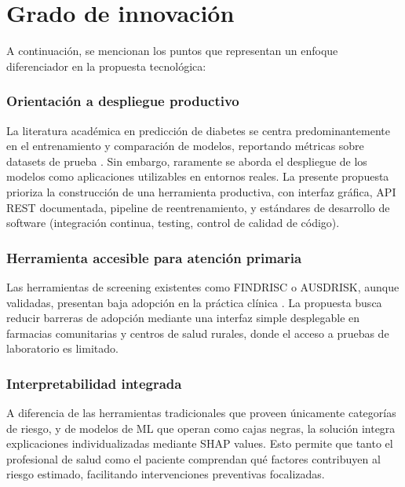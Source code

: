 \documentclass[12pt, a4paper]{report}
\begin{document}

\chapter{Grado de innovación}

A continuación, se mencionan los puntos que representan un enfoque diferenciador en la propuesta tecnológica:

\subsection*{Orientación a despliegue productivo}

La literatura académica en predicción de diabetes se centra predominantemente en el entrenamiento y comparación de modelos, reportando métricas sobre datasets de prueba \citep{qin2022machine, li2024diabetes}. Sin embargo, raramente se aborda el despliegue de los modelos como aplicaciones utilizables en entornos reales. La presente propuesta prioriza la construcción de una herramienta productiva, con interfaz gráfica, API REST documentada, pipeline de reentrenamiento, y estándares de desarrollo de software (integración continua, testing, control de calidad de código).

\subsection*{Herramienta accesible para atención primaria}

Las herramientas de screening existentes como FINDRISC o AUSDRISK, aunque validadas, presentan baja adopción en la práctica clínica \citep{wong2011ausdrisk}. La propuesta busca reducir barreras de adopción mediante una interfaz simple desplegable en farmacias comunitarias y centros de salud rurales, donde el acceso a pruebas de laboratorio es limitado.

\subsection*{Interpretabilidad integrada}

A diferencia de las herramientas tradicionales que proveen únicamente categorías de riesgo, y de modelos de ML que operan como cajas negras, la solución integra explicaciones individualizadas mediante SHAP values. Esto permite que tanto el profesional de salud como el paciente comprendan qué factores contribuyen al riesgo estimado, facilitando intervenciones preventivas focalizadas.
\end{document}
